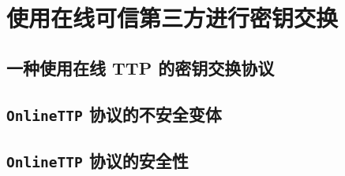 \section{使用在线可信第三方进行密钥交换}\label{sec:21-12}

\subsection{一种使用在线 TTP 的密钥交换协议}\label{subsec:21-12-1}

\subsection{\texttt{OnlineTTP} 协议的不安全变体}\label{subsec:21-12-2}

\subsection{\texttt{OnlineTTP} 协议的安全性}\label{subsec:21-12-3}

\begin{theorem}\label{theo:21-9}
	
\end{theorem}
